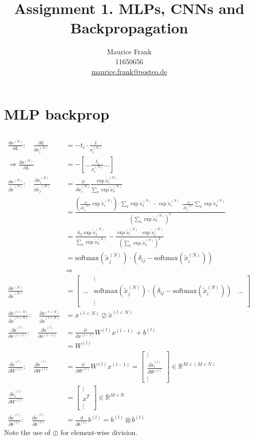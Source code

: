 \documentclass{article}
\title{Assignment 1. MLPs, CNNs and Backpropagation}
\author{%
  Maurice Frank\\
  11650656\\
  \href{mailto:maurice.frank@posteo.de}{maurice.frank@posteo.de} \\
}
\newcommand\bM[1]{\ensuremath{\begin{bmatrix}#1\end{bmatrix}}}
\newcommand\·{\ensuremath{\cdot}}
\newcommand\…{\ensuremath{\ldots}}
\renewcommand\t{\ensuremath{\times}}
\newcommand\f[2]{\ensuremath{\frac{#1}{#2}}}
\newcommand\pf[2]{\ensuremath{\frac{\partial {#1}}{\partial {#2}}}}
\newcommand\1{\ensuremath{\mathds{1}}}
\newcommand\R{\ensuremath{\mathds{R}}}
\begin{document}
\maketitle
\section{MLP backprop}
\subsection{}
\subsubsection{}
\begin{align}
  \pf{x^{(N)}}L:\quad
  \pf L{x_i^{(N)}} &= -t_i\·\f{1}{x_i^{(N)}}\\
  \Rightarrow \pf{x^{(N)}}L &= -[\hdots \f{t_i}{x_i^{(N)}}\hdots]\\
  \pf{x^{(N)}}{\tilde{x}^{(N)}}:\quad
  \pf{x_i^{(N)}}{\tilde{x_j}^{(N)}} &= \pf{}{\tilde{x}_j^{(N)}}\f{\exp{\tilde{x}_i^{(N)}}}{\sum_k \exp{\tilde{x}_k^{(N)}}}\\
  &= \f{(\pf{}{\tilde{x}^{(N)}_j}\exp{\tilde{x}^{(N)}_i})\·\sum_k\exp{\tilde{x}^{(N)}_k} - \exp{\tilde{x}^{(N)}_i}\·\pf{}{\tilde{x}^{(N)}_j}\sum_k\exp{\tilde{x}^{(N)}_k}}{(\sum_k\exp{\tilde{x}^{(N)}_k})^2}\\
  &= \f{\delta_{ij}\exp{\tilde{x}^{(N)}_j}}{\sum_k\exp{\tilde{x}^{(N)}_k}} - \f{\exp{\tilde{x}^{(N)}_i}\·\exp{\tilde{x}^{(N)}_j}}{(\sum_k\exp{\tilde{x}^{(N)}_k})^2}\\
  &= \text{softmax}(\tilde{x}^{(N)}_j)\·(\delta_{ij} - \text{softmax}(\tilde{x}^{(N)}_i))\\
  &\Rightarrow\\
  \pf{x^{(N)}}{\tilde{x}^{(N)}} &= \bM{& \vdots &\\\hdots & \text{softmax}(\tilde{x}^{(N)}_j)\·(\delta_{ij} - \text{softmax}(\tilde{x}^{(N)}_i)) & \hdots\\ & \vdots &}\\
  \pf{x^{(l<N)}}{\tilde{x}^{(l<N)}}:\quad
  \pf{x^{(l<N)}}{\tilde{x}^{(l<N)}} &= x^{(l<N)}\oslash\tilde{x}^{(l<N)}\\
  \pf{\tilde{x}^{(l)}}{x^{(l-1)}}:\quad
  \pf{\tilde{x}^{(l)}}{x^{(l-1)}} &= \pf{}{x^{(l-1)}} W^{(l)}x^{(l-1)} + b^{(l)}\\&=W^{(l)}\\
  \pf{\tilde{x}^{(l)}}{W^{(l)}}:\quad
  \pf{\tilde{x}^{(l)}}{W^{(l)}} &= \pf{}{W^{(l)}}W^{(l)}x^{(l-1)} = \bM{\vdots\\\pf{\tilde{x}^{(l)}_i}{W^{(l)}}\\\vdots}\in\R^{M\t (M\t N)}\\
  \pf{\tilde{x}^{(l)}_i}{W^{(l)}} &= \bM{\vdots\\x^T\\\vdots}\in\R^{M\t N}\\
  \pf{\tilde{x}^{(l)}}{b^(l)}:\quad
  \pf{\tilde{x}^{(l)}}{b^(l)} &= \pf{}{b^(l)}b^{(l)} = b^{(l)} \otimes b^{(l)}
\end{align}
Note the use of $\oslash$ for element-wise division.
\end{document}
